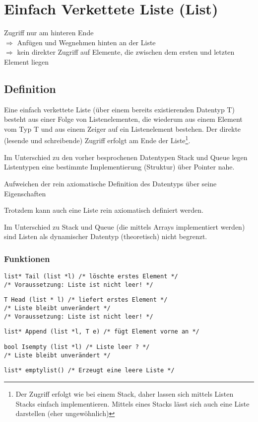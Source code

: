 \section{Einfach Verkettete Liste (List)}
Zugriff nur {\flqq am hinteren Ende\frqq}\\
$\Rightarrow$ Anfügen und Wegnehmen hinten an der Liste\\
$\Rightarrow$ kein direkter Zugriff auf Elemente, die zwischen dem ersten und letzten Element liegen

\subsection{Definition}
Eine einfach verkettete Liste (über einem bereits existierenden Datentyp T) besteht aus einer Folge von Listenelementen, die wiederum aus einem Element vom Typ T und aus einem Zeiger auf ein Listenelement bestehen. Der direkte (lesende und schreibende) Zugriff erfolgt am Ende der Liste\footnote{Der Zugriff erfolgt wie bei einem Stack, daher lassen sich mittels Listen Stacks einfach implementieren. Mittels eines Stacks lässt sich auch eine Liste darstellen (eher ungewöhnlich)}.

\begin{compactitem}
	\item Im Unterschied zu den vorher besprochenen Datentypen Stack und Queue legen Listentypen eine bestimmte Implementierung (Struktur) über Pointer nahe.
	\item {\flqq Aufweichen\frqq} der rein axiomatische Definition des Datentyps über seine Eigenschaften
	\item Trotzdem kann auch eine Liste {\flqq rein axiomatisch\frqq} definiert werden.
	\item Im Unterschied zu Stack und Queue (die mittels Arrays implementiert werden) sind Listen als dynamischer Datentyp (theoretisch) nicht begrenzt.
\end{compactitem}

\subsubsection{Funktionen}
\begin{compactitem}
	\item \verb|list* Tail (list *l) /* löschte erstes Element */|\\
	\verb|/* Voraussetzung: Liste ist nicht leer! */|
	\item \verb|T Head (list * l) /* liefert erstes Element */|\\
	\verb|/* Liste bleibt unverändert */|\\
	\verb|/* Voraussetzung: Liste ist nicht leer! */|
	\item \verb|list* Append (list *l, T e) /* fügt Element vorne an */|
	\item \verb|bool Isempty (list *l) /* Liste leer ? */|\\
	\verb|/* Liste bleibt unverändert */|
	\item \verb|list* emptylist() /* Erzeugt eine leere Liste */|
\end{compactitem}

